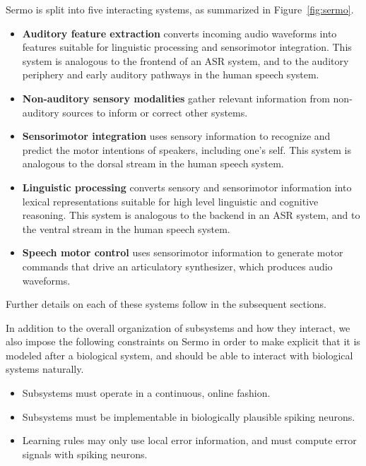Sermo is split into five interacting systems,
as summarized in Figure~\ref{fig:sermo}.
\begin{itemize}
  \item \textbf{Auditory feature extraction}
    converts incoming audio waveforms into
    features suitable for linguistic processing
    and sensorimotor integration.
    This system is analogous to the frontend
    of an ASR system,
    and to the auditory periphery and
    early auditory pathways in the human speech system.
  \item \textbf{Non-auditory sensory modalities}
    gather relevant information
    from non-auditory sources
    to inform or correct other systems.
  \item \textbf{Sensorimotor integration}
    uses sensory information to
    recognize and predict the motor intentions
    of speakers, including one's self.
    This system is analogous to the
    dorsal stream in the human speech system.
  \item \textbf{Linguistic processing}
    converts sensory and sensorimotor information
    into lexical representations
    suitable for high level linguistic
    and cognitive reasoning.
    This system is analogous to
    the backend in an ASR system,
    and to the ventral stream
    in the human speech system.
  \item \textbf{Speech motor control}
    uses sensorimotor information
    to generate motor commands
    that drive an articulatory synthesizer,
    which produces audio waveforms.
\end{itemize}

Further details on each of these
systems follow in the subsequent sections.

In addition to the overall organization
of subsystems and how they interact,
we also impose the following constraints
on Sermo in order to make explicit
that it is modeled after a biological system,
and should be able to interact
with biological systems naturally.

\begin{itemize}
  \item Subsystems must operate in a continuous, online fashion.
  \item Subsystems must be implementable in biologically plausible
    spiking neurons.
  \item Learning rules may only use local error information,
    and must compute error signals with spiking neurons.
\end{itemize}

